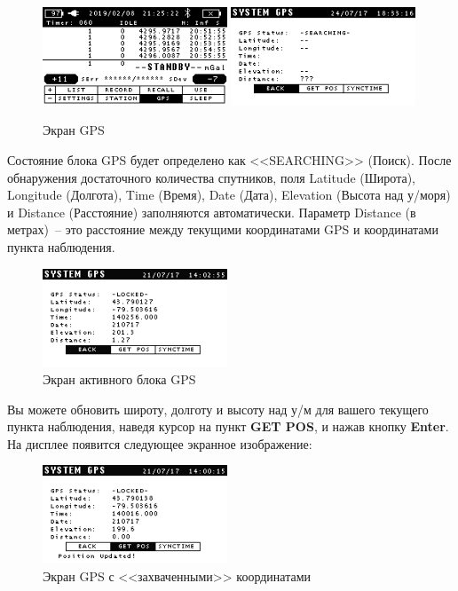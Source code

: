 \begin{figure}[h]
  \centering
  \includegraphics[width=0.49\textwidth]{figures/the_gps_screen_1}
  \includegraphics[width=0.49\textwidth]{figures/the_gps_screen_2}
  \caption{Экран GPS}
  \label{fig:the_gps_screen_2}
\end{figure}

Состояние блока GPS будет определено как <<SEARCHING>> (Поиск). После
обнаружения достаточного количества спутников, поля Latitude (Широта), Longitude
(Долгота), Time (Время), Date (Дата), Elevation (Высота над у/моря) и Distance
(Расстояние) заполняются автоматически. Параметр Distance (в метрах)~-- это
расстояние между текущими координатами GPS и координатами пункта наблюдения.

\begin{figure}[h]
  \centering
  \includegraphics[width=0.49\textwidth]{figures/the_gps_active_screen}
  \caption{Экран активного блока GPS}
  \label{fig:the_gps_active_screen}
\end{figure}

Вы можете обновить широту, долготу и высоту над у/м для вашего текущего пункта
наблюдения, наведя курсор на пункт \textbf{GET POS}, и нажав кнопку
\textbf{Enter}. На дисплее появится следующее экранное изображение:

\begin{figure}[h]
  \centering
  \includegraphics[width=0.49\textwidth]{figures/the_gps_screen_with_locked_positions}
  \caption{Экран GPS с <<захваченными>> координатами}
  \label{fig:the_gps_screen_with_locked_positions}
\end{figure}

